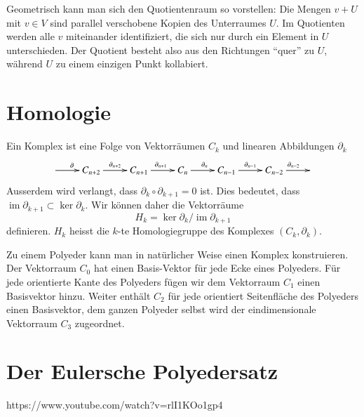 Geometrisch kann man sich den Quotientenraum so vorstellen:
Die Mengen $v+U$ mit $v\in V$ sind parallel verschobene Kopien des
Unterraumes $U$.
Im Quotienten werden alle $v$ miteinander identifiziert, die sich nur
durch ein Element in $U$ unterschieden.
Der Quotient besteht also aus den Richtungen ``quer'' zu $U$, während 
$U$ zu einem einzigen Punkt kollabiert.

\section{Homologie}
Ein Komplex ist eine Folge von Vektorräumen $C_k$ und linearen Abbildungen
$\partial_k$
\[
\xymatrix{
*+\txt{} \ar[r]^{\partial}
	&C_{n+2} \ar[r]^{\partial_{n+2}}
		&C_{n+1} \ar[r]^{\partial_{n+1}}
			&C_{n} \ar[r]^{\partial_n}
				&C_{n-1} \ar[r]^{\partial_{n-1}}
					&C_{n-2} \ar[r]^{\partial_{n-2}}
						&*+\txt{}
}
\]
Ausserdem wird verlangt, dass $\partial_{k} \circ \partial_{k+1}=0$ ist.
Dies bedeutet, dass
$\operatorname{im}\partial_{k+1}\subset \operatorname{ker}\partial_{k}$.
Wir können daher die Vektorräume
\[
H_k = \operatorname{ker}\partial_k/\operatorname{im}\partial_{k+1}
\]
definieren.
$H_k$ heisst die $k$-te Homologiegruppe des Komplexes $(C_k,\partial_k)$.

Zu einem Polyeder kann man in natürlicher Weise einen Komplex konstruieren.
Der Vektorraum $C_0$ hat einen Basis-Vektor für jede Ecke eines Polyeders.
Für jede orientierte Kante des Polyeders fügen wir dem Vektorraum $C_1$
einen Basisvektor hinzu. 
Weiter enthält $C_2$ für jede orientiert Seitenfläche des Polyeders
einen Basisvektor, dem ganzen Polyeder selbst wird der eindimensionale
Vektorraum $C_3$ zugeordnet.

\section{Der Eulersche Polyedersatz}




https://www.youtube.com/watch?v=rlI1KOo1gp4





